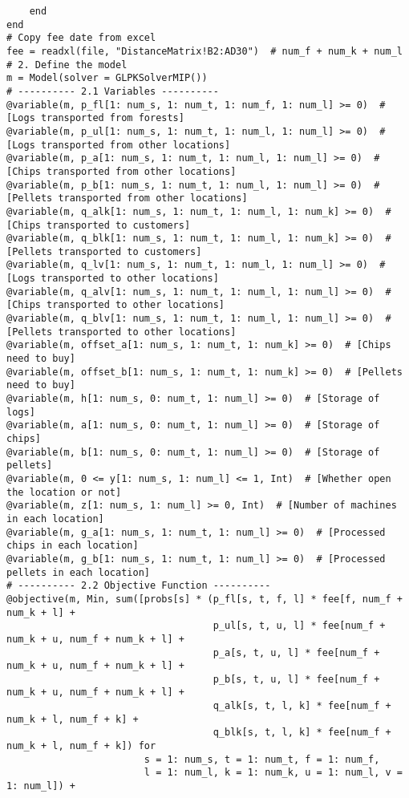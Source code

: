 \documentclass[fleqn,10pt]{wlscirep}
\begin{document}
\begin{lstlisting}
    end
end
# Copy fee date from excel
fee = readxl(file, "DistanceMatrix!B2:AD30")  # num_f + num_k + num_l
# 2. Define the model
m = Model(solver = GLPKSolverMIP())
# ---------- 2.1 Variables ----------
@variable(m, p_fl[1: num_s, 1: num_t, 1: num_f, 1: num_l] >= 0)  # [Logs transported from forests]
@variable(m, p_ul[1: num_s, 1: num_t, 1: num_l, 1: num_l] >= 0)  # [Logs transported from other locations]
@variable(m, p_a[1: num_s, 1: num_t, 1: num_l, 1: num_l] >= 0)  # [Chips transported from other locations]
@variable(m, p_b[1: num_s, 1: num_t, 1: num_l, 1: num_l] >= 0)  # [Pellets transported from other locations]
@variable(m, q_alk[1: num_s, 1: num_t, 1: num_l, 1: num_k] >= 0)  # [Chips transported to customers]
@variable(m, q_blk[1: num_s, 1: num_t, 1: num_l, 1: num_k] >= 0)  # [Pellets transported to customers]
@variable(m, q_lv[1: num_s, 1: num_t, 1: num_l, 1: num_l] >= 0)  # [Logs transported to other locations]
@variable(m, q_alv[1: num_s, 1: num_t, 1: num_l, 1: num_l] >= 0)  # [Chips transported to other locations]
@variable(m, q_blv[1: num_s, 1: num_t, 1: num_l, 1: num_l] >= 0)  # [Pellets transported to other locations]
@variable(m, offset_a[1: num_s, 1: num_t, 1: num_k] >= 0)  # [Chips need to buy]
@variable(m, offset_b[1: num_s, 1: num_t, 1: num_k] >= 0)  # [Pellets need to buy]
@variable(m, h[1: num_s, 0: num_t, 1: num_l] >= 0)  # [Storage of logs]
@variable(m, a[1: num_s, 0: num_t, 1: num_l] >= 0)  # [Storage of chips]
@variable(m, b[1: num_s, 0: num_t, 1: num_l] >= 0)  # [Storage of pellets]
@variable(m, 0 <= y[1: num_s, 1: num_l] <= 1, Int)  # [Whether open the location or not]
@variable(m, z[1: num_s, 1: num_l] >= 0, Int)  # [Number of machines in each location]
@variable(m, g_a[1: num_s, 1: num_t, 1: num_l] >= 0)  # [Processed chips in each location]
@variable(m, g_b[1: num_s, 1: num_t, 1: num_l] >= 0)  # [Processed pellets in each location]
# ---------- 2.2 Objective Function ----------
@objective(m, Min, sum([probs[s] * (p_fl[s, t, f, l] * fee[f, num_f + num_k + l] +
                                    p_ul[s, t, u, l] * fee[num_f + num_k + u, num_f + num_k + l] +
                                    p_a[s, t, u, l] * fee[num_f + num_k + u, num_f + num_k + l] +
                                    p_b[s, t, u, l] * fee[num_f + num_k + u, num_f + num_k + l] +
                                    q_alk[s, t, l, k] * fee[num_f + num_k + l, num_f + k] +
                                    q_blk[s, t, l, k] * fee[num_f + num_k + l, num_f + k]) for
                        s = 1: num_s, t = 1: num_t, f = 1: num_f,
                        l = 1: num_l, k = 1: num_k, u = 1: num_l, v = 1: num_l]) +

\end{lstlisting}
\end{document}
